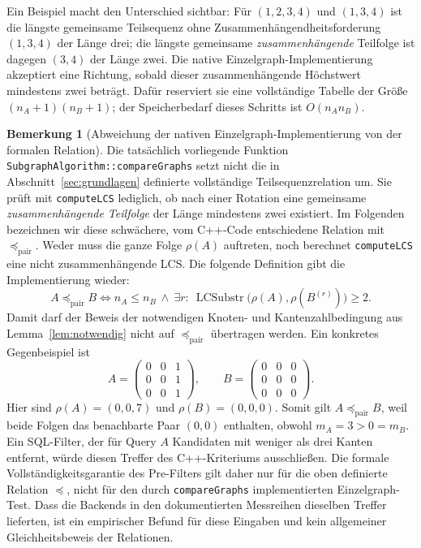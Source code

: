 \documentclass[a4paper,12pt, twoside]{report}
\theoremstyle{definition}
\newtheorem{bemerkung}{Bemerkung}
\begin{document}
Ein Beispiel macht den Unterschied sichtbar: Für $(1,2,3,4)$ und $(1,3,4)$ ist die längste gemeinsame Teilsequenz ohne Zusammenhängendheitsforderung $(1,3,4)$ der Länge drei; die längste gemeinsame \emph{zusammenhängende} Teilfolge ist dagegen $(3,4)$ der Länge zwei. Die native Einzelgraph-Implementierung akzeptiert eine Richtung, sobald dieser zusammenhängende Höchstwert mindestens zwei beträgt. Dafür reserviert sie eine vollständige Tabelle der Größe $(n_A+1)(n_B+1)$; der Speicherbedarf dieses Schritts ist $O(n_A n_B)$.

\begin{bemerkung}[Abweichung der nativen Einzelgraph-Implementierung von der formalen Relation]
	\label{bem:cpp_relation}
	Die tatsächlich vorliegende Funktion \texttt{SubgraphAlgorithm::compareGraphs} setzt nicht die in Abschnitt~\ref{sec:grundlagen} definierte vollständige Teilsequenzrelation um. Sie prüft mit \texttt{computeLCS} lediglich, ob nach einer Rotation eine gemeinsame \emph{zusammenhängende Teilfolge} der Länge mindestens zwei existiert. Im Folgenden bezeichnen wir diese schwächere, vom C++-Code entschiedene Relation mit $\preceq_{\mathrm{pair}}$. Weder muss die ganze Folge $\rho(A)$ auftreten, noch berechnet \texttt{computeLCS} eine nicht zusammenhängende LCS. Die folgende Definition gibt die Implementierung wieder:
	\[
	A\preceq_{\mathrm{pair}} B
	\iff n_A\le n_B\ \land\
	\exists r:\ \operatorname{LCSubstr}\bigl(\rho(A),\rho(B^{(r)})\bigr)\ge2.
	\]
	Damit darf der Beweis der notwendigen Knoten- und Kantenzahlbedingung aus Lemma~\ref{lem:notwendig} nicht auf $\preceq_{\mathrm{pair}}$ übertragen werden. Ein konkretes Gegenbeispiel ist
	\[
	A=\begin{pmatrix}0&0&1\\0&0&1\\0&0&1\end{pmatrix},
	\qquad
	B=\begin{pmatrix}0&0&0\\0&0&0\\0&0&0\end{pmatrix}.
	\]
	Hier sind $\rho(A)=(0,0,7)$ und $\rho(B)=(0,0,0)$. Somit gilt $A\preceq_{\mathrm{pair}}B$, weil beide Folgen das benachbarte Paar $(0,0)$ enthalten, obwohl $m_A=3>0=m_B$. Ein SQL-Filter, der für Query $A$ Kandidaten mit weniger als drei Kanten entfernt, würde diesen Treffer des C++-Kriteriums ausschließen. Die formale Vollständigkeitsgarantie des Pre-Filters gilt daher nur für die oben definierte Relation $\preceq$, nicht für den durch \texttt{compareGraphs} implementierten Einzelgraph-Test. Dass die Backends in den dokumentierten Messreihen dieselben Treffer lieferten, ist ein empirischer Befund für diese Eingaben und kein allgemeiner Gleichheitsbeweis der Relationen.
\end{bemerkung}
\end{document}
